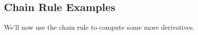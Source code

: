 %


\subsection*{Chain Rule Examples}

We'll now use the chain rule to compute some more derivatives.

